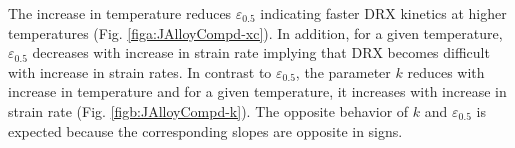 \documentclass[a4paper, 11pt, dvipsnames]{article}
\begin{document}
The increase in temperature reduces $\varepsilon_{0.5}$ indicating faster DRX kinetics at higher temperatures (Fig. \ref{figa:JAlloyCompd-xc}). In addition, for a given temperature, $\varepsilon_{0.5}$ decreases with increase in strain rate implying that DRX becomes difficult with increase in strain rates. In contrast to $\varepsilon_{0.5}$, the parameter $k$ reduces with increase in temperature and for a given temperature, it increases with increase in strain rate (Fig. \ref{figb:JAlloyCompd-k}). The opposite behavior of $k$ and $\varepsilon_{0.5}$ is expected because the corresponding slopes are opposite in signs. 
\end{document}
